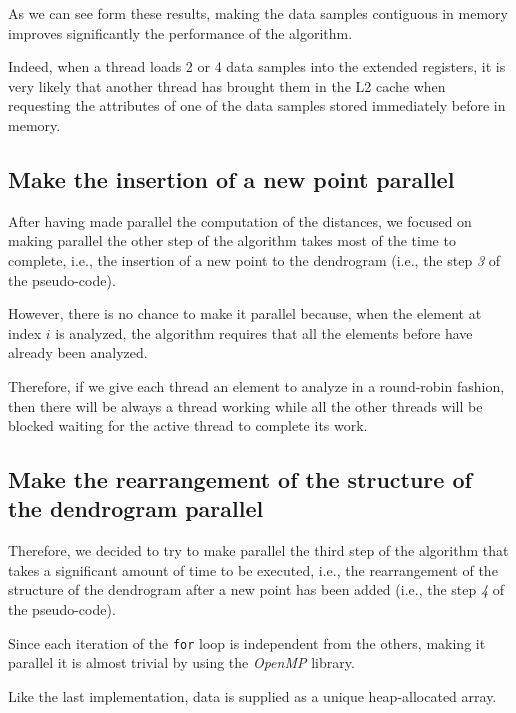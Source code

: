 \documentclass{article}
\begin{document}
As we can see form these results, making the data samples contiguous in memory improves
significantly the performance of the algorithm.

Indeed, when a thread loads 2 or 4 data samples into the extended registers, it is very likely
that another thread has brought them in the L2 cache when requesting the attributes of one of the
data samples stored immediately before in memory.

\hypertarget{stage-3-parallel}{
\subsection{Make the insertion of a new point parallel}
\label{stage-3-parallel}}

After having made parallel the computation of the distances, we focused on making parallel the other
step of the algorithm takes most of the time to complete, i.e., the insertion of a new point to
the dendrogram (i.e., the step \textit{3} of the pseudo-code).

However, there is no chance to make it parallel because, when the element at index $i$ is
analyzed, the algorithm requires that all the elements before have already been analyzed.

Therefore, if we give each thread an element to analyze in a round-robin fashion, then there will
be always a thread working while all the other threads will be blocked waiting for the active
thread to complete its work.

\hypertarget{stage-4-parallel}{
\subsection{Make the rearrangement of the structure of the dendrogram parallel}
\label{stage-4-parallel}}

Therefore, we decided to try to make parallel the third step of the algorithm that takes a
significant amount of time to be executed, i.e., the rearrangement of the structure of the
dendrogram after a new point has been added (i.e., the step \textit{4} of the pseudo-code).

Since each iteration of the \texttt{for} loop is independent from the others, making it parallel
it is almost trivial by using the \emph{OpenMP} library.

Like the last implementation, data is supplied as a unique heap-allocated array.
\end{document}
